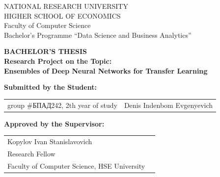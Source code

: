 \begin{titlepage}
\newpage

{
\begin{center}
NATIONAL RESEARCH UNIVERSITY\\
HIGHER SCHOOL OF ECONOMICS
\\
\bigskip
Faculty of Computer Science\\
Bachelor’s Programme “Data Science and Business Analytics”
\end{center}
}

\vspace{7em}

\begin{center}
{\bf BACHELOR'S THESIS}\\
{\bf Research Project on the Topic:}\\
{\bf Ensembles of Deep Neural Networks for Transfer Learning}\\
\end{center}

\vspace{2em}

{\bf Submitted by the Student: \vspace{2mm}}

{
\begin{tabular}{l@{\hskip 1.5cm}l}
group \#\foreignlanguage{russian}{БПАД}242, 2th year of study & 
Denis Indenbom Evgenyevich
\end{tabular}}


\vspace{1em}
{\bf Approved by the Supervisor: \vspace{2mm}}

{
\begin{tabular}{l@{\hskip 1.5cm}l}
Kopylov Ivan Stanislavovich\\
Research Fellow\\
Faculty of Computer Science, HSE University 
\end{tabular}}


\end{titlepage}
